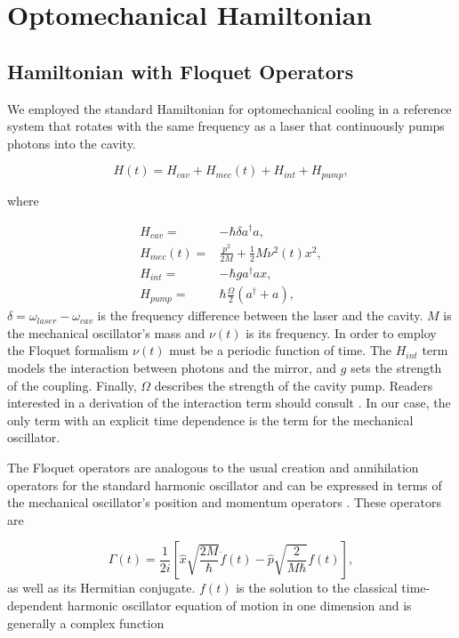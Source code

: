 \documentclass[reprint, amsmath,amssymb, aps,pra]{revtex4-1}
\begin{document}
\section{Optomechanical Hamiltonian}\label{OptmechH}
\subsection{Hamiltonian with Floquet Operators}
	
	We employed the standard Hamiltonian for optomechanical cooling \cite{LCNooshi} in a reference system that rotates with the same frequency as a laser that continuously pumps photons into the cavity. 

\begin{equation}
H(t) =   H_{cav} + H_{mec}(t) + H_{int} + H_{pump},
\end{equation}

where

\begin{align}
H_{cav} =& -\hbar \delta a^\dagger a,\\
H_{mec}(t) =& \frac{p^2}{2M} + \frac{1}{2}M \nu^2 (t) x^2,\\
H_{int} =& -\hbar g a^\dagger a x,\\
H_{pump} =& \hbar\frac{\Omega}{2}(a^\dagger + a),
\end{align}
$\delta = \omega_{laser} - \omega_{cav}$ is the frequency difference
between the laser and the cavity. $M$ is the mechanical oscillator's
mass and $\nu(t)$ is its frequency. In order to employ the Floquet
formalism $\nu(t)$ must be a periodic function of time. The $H_{int}$
term models the interaction between photons and the mirror, and $g$
sets the strength of the coupling. Finally, $\Omega$ describes the strength
of the cavity pump. Readers interested in a derivation of the
interaction term should consult \cite{KippenberCO}. In our case, the only term with
an explicit time dependence is the term for the mechanical oscillator.

The Floquet operators are analogous to the usual creation and annihilation operators for the standard harmonic oscillator and can be expressed in terms of the
mechanical oscillator's position and momentum operators \cite{HanngiFM}. These operators are

\begin{equation}\label{FloquetOperators}
\Gamma(t) = \frac{1}{2i}\left[\hat{x}\sqrt{\frac{2M}{\hbar}}\dot{f}(t)-\hat{p}\sqrt{\frac{2}{M \hbar }}f(t)\right],
\end{equation} as well as its Hermitian conjugate. $f(t)$ is the solution to the classical time-dependent harmonic oscillator equation of motion in one dimension and is generally a complex function \cite{BrownPT}
\end{document}
